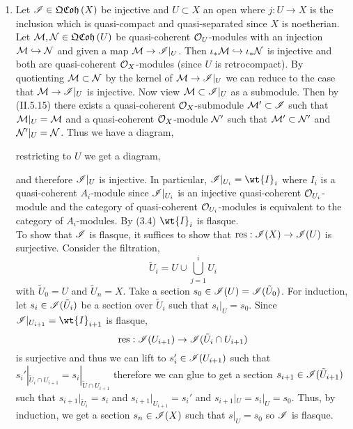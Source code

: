 \documentclass[12pt]{article}
\begin{document}
\begin{enumerate}
\item Let $\mathscr{I} \in \mathfrak{QCoh}\left(X\right)$ be injective and $U \subset X$ an open where $j : U \to X$ is the inclusion which is quasi-compact and quasi-separated since $X$ is noetherian. Let $\mathcal{M}, \mathcal{N} \in \mathfrak{QCoh}\left(U\right)$ be quasi-coherent $\mathcal{O}_{U}$-modules with an injection $\mathcal{M} \hookrightarrow \mathcal{N}$ and given a map $\mathcal{M} \to \mathscr{I}|_U$. Then $\iota_* \mathcal{M} \hookrightarrow \iota_* \mathcal{N}$ is injective and both are quasi-coherent $\mathcal{O}_{X}$-modules (since $U$ is retrocompact). By quotienting $\mathcal{M} \subset \mathcal{N}$ by the kernel of $\mathcal{M} \to \mathscr{I}|_U$ we can reduce to the case that $\mathcal{M} \to \mathscr{I}|_U$ is injective. Now view $\mathcal{M} \subset \mathscr{I}|_U$ as a submodule. Then by (II.5.15) there exists a quasi-coherent $\mathcal{O}_{X}$-submodule $\mathcal{M}' \subset \mathscr{I}$ such that $\mathcal{M}|_U = \mathcal{M}$ and a quasi-coherent $\mathcal{O}_{X}$-module $\mathcal{N}'$ such that $\mathcal{M}' \subset \mathcal{N}'$ and $\mathcal{N}'|_U = \mathcal{N}$. Thus we have a diagram,
\begin{center}
\end{center}
restricting to $U$ we get a diagram,
\begin{center}
\end{center}
and therefore $\mathscr{I}|_U$ is injective. In particular, $\I|_{U_i} = \wt{I}_i$ where $I_i$ is a quasi-coherent $A_i$-module since $\mathscr{I}|_{U_i}$ is an injective quasi-coherent $\mathcal{O}_{U_i}$-module and the category of quasi-coherent $\mathcal{O}_{U_i}$-modules is equivalent to the category of $A_i$-modules. By (3.4) $\wt{I}_i$ is flasque.
\bigskip\\
To show that $\mathscr{I}$ is flasque, it suffices to show that $\mathrm{res} : \mathscr{I}(X) \to \mathscr{I}(U)$ is surjective. Consider the filtration,
\[ \tilde{U}_i = U \cup \bigcup_{j = 1}^i U_i \]
with $\tilde{U}_0 = U$ and $\tilde{U}_n = X$.
Take a section $s_0 \in \mathscr{I}(U) = \mathscr{I}(\tilde{U}_0)$. For induction, let $s_i \in \mathscr{I}(\tilde{U}_i)$ be a section over $\tilde{U}_i$ such that $s_i |_{U} = s_0$. Since $\I|_{U_{i+1}} = \wt{I}_{i+1}$ is flasque,
\[ \mathrm{res} : \mathscr{I}(U_{i+1}) \to \mathscr{I}(\tilde{U}_i \cap U_{i+1}) \]
is surjective and thus we can lift to $s_i' \in \mathscr{I}(U_{i+1})$ such that $s_i' |_{\tilde{U}_i \cap U_{i+1}} = s_i |_{\tilde{U} \cap U_{i+1}}$ therefore we can glue to get a section $s_{i+1} \in \mathscr{I}(\tilde{U}_{i+1})$ such that $s_{i+1}|_{\tilde{U}_i} = s_i$ and $s_{i+1}|_{U_{i+1}} = s_i'$ and $s_{i+1}|_U = s_{i}|_U = s_0$. Thus, by induction, we get a section $s_n \in \mathscr{I}(X)$ such that $s |_U = s_0$ so $\mathscr{I}$ is flasque.


\end{enumerate}
\end{document}
